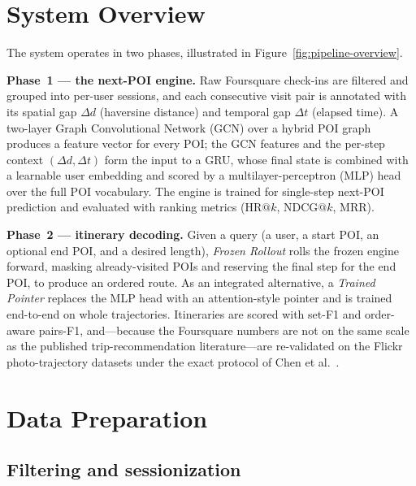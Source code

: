 \section{System Overview}
\label{sec:sol-overview}

The system operates in two phases, illustrated in Figure~\ref{fig:pipeline-overview}.



\textbf{Phase~1 --- the next-POI engine.} Raw Foursquare check-ins are filtered and grouped
into per-user sessions, and each consecutive visit pair is annotated with its spatial gap
$\Delta d$ (haversine distance) and temporal gap $\Delta t$ (elapsed time). A two-layer Graph
Convolutional Network (GCN) over a hybrid POI graph produces a feature vector for every POI;
the GCN features and the per-step context $(\Delta d,\Delta t)$ form the input to a GRU, whose
final state is combined with a learnable user embedding and scored by a multilayer-perceptron
(MLP) head over the full POI vocabulary. The engine is trained for single-step next-POI
prediction and evaluated with ranking metrics ($\mathrm{HR@}k$, $\mathrm{NDCG@}k$,
$\mathrm{MRR}$).

\textbf{Phase~2 --- itinerary decoding.} Given a query (a user, a start POI, an optional end
POI, and a desired length), \emph{Frozen Rollout} rolls the frozen engine forward, masking
already-visited POIs and reserving the final step for the end POI, to produce an ordered route.
As an integrated alternative, a \emph{Trained Pointer} replaces the MLP head with an
attention-style pointer and is trained end-to-end on whole trajectories. Itineraries are scored
with set-F1 and order-aware pairs-F1, and---because the Foursquare numbers are not on the same
scale as the published trip-recommendation literature---are re-validated on the Flickr
photo-trajectory datasets under the exact protocol of Chen et al.~\cite{chen2016learning}.

\section{Data Preparation}
\label{sec:sol-data}

\subsection{Filtering and sessionization}
\label{sec:sol-data-filter}

